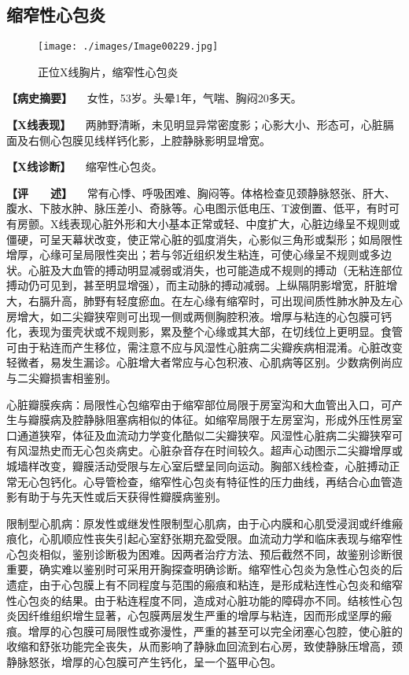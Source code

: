 \subsection{缩窄性心包炎}

\begin{figure}[!htbp]
 \centering
 \texttt{[image: ./images/Image00229.jpg]}
 \captionsetup{justification=centering}
 \caption{正位X线胸片，缩窄性心包炎}
 \label{fig4-8-2}
  \end{figure} 

\textbf{【病史摘要】} 　女性，53岁。头晕1年，气喘、胸闷20多天。

\textbf{【X线表现】}
　两肺野清晰，未见明显异常密度影；心影大小、形态可，心脏膈面及右侧心包膜见线样钙化影，上腔静脉影明显增宽。

\textbf{【X线诊断】} 　缩窄性心包炎。

\textbf{【评　　述】}
　常有心悸、呼吸困难、胸闷等。体格检查见颈静脉怒张、肝大、腹水、下肢水肿、脉压差小、奇脉等。心电图示低电压、T波倒置、低平，有时可有房颤。X线表现心脏外形和大小基本正常或轻、中度扩大，心脏边缘呈不规则或僵硬，可呈天幕状改变，使正常心脏的弧度消失，心影似三角形或梨形；如局限性增厚，心缘可呈局限性突出；若与邻近组织发生粘连，可使心缘呈不规则或多边状。心脏及大血管的搏动明显减弱或消失，也可能造成不规则的搏动（无粘连部位搏动仍可见到，甚至明显增强），而主动脉的搏动减弱。上纵隔阴影增宽，肝脏增大，右膈升高，肺野有轻度瘀血。在左心缘有缩窄时，可出现间质性肺水肿及左心房增大，如二尖瓣狭窄则可出现一侧或两侧胸腔积液。增厚与粘连的心包膜可钙化，表现为蛋壳状或不规则影，累及整个心缘或其大部，在切线位上更明显。食管可由于粘连而产生移位，需注意不应与风湿性心脏病二尖瓣疾病相混淆。心脏改变轻微者，易发生漏诊。心脏增大者常应与心包积液、心肌病等区别。少数病例尚应与二尖瓣损害相鉴别。

心脏瓣膜疾病：局限性心包缩窄由于缩窄部位局限于房室沟和大血管出入口，可产生与瓣膜病及腔静脉阻塞病相似的体征。如缩窄局限于左房室沟，形成外压性房室口通道狭窄，体征及血流动力学变化酷似二尖瓣狭窄。风湿性心脏病二尖瓣狭窄可有风湿热史而无心包炎病史。心脏杂音存在时间较久。超声心动图示二尖瓣增厚或城墙样改变，瓣膜活动受限与左心室后壁呈同向运动。胸部X线检查，心脏搏动正常无心包钙化。心导管检查，缩窄性心包炎有特征性的压力曲线，再结合心血管造影有助于与先天性或后天获得性瓣膜病鉴别。

限制型心肌病：原发性或继发性限制型心肌病，由于心内膜和心肌受浸润或纤维瘢痕化，心肌顺应性丧失引起心室舒张期充盈受限。血流动力学和临床表现与缩窄性心包炎相似，鉴别诊断极为困难。因两者治疗方法、预后截然不同，故鉴别诊断很重要，确实难以鉴别时可采用开胸探查明确诊断。缩窄性心包炎为急性心包炎的后遗症，由于心包膜上有不同程度与范围的瘢痕和粘连，是形成粘连性心包炎和缩窄性心包炎的结果。由于粘连程度不同，造成对心脏功能的障碍亦不同。结核性心包炎因纤维组织增生显著，心包膜两层发生严重的增厚与粘连，因而形成坚厚的瘢痕。增厚的心包膜可局限性或弥漫性，严重的甚至可以完全闭塞心包腔，使心脏的收缩和舒张功能完全丧失，从而影响了静脉血回流到右心房，致使静脉压增高，颈静脉怒张，增厚的心包膜可产生钙化，呈一个盔甲心包。

